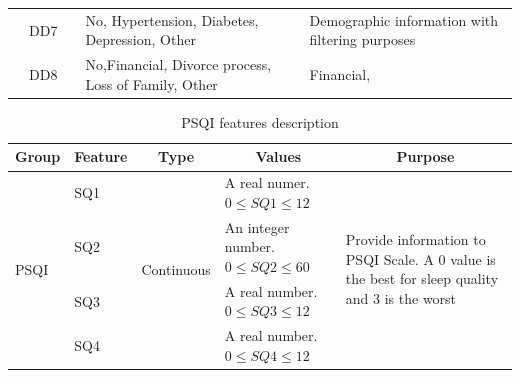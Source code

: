 \documentclass[]{book}
\begin{document}
\begin{table}[ht]
\begin{tabular}{|l|l|l|p{5cm}|p{4cm}|}
        & DD7                                   &                                    & No, Hypertension, Diabetes, Depression, Other                                            & Demographic information with filtering purposes                 \\ \cline{2-5} 
        & DD8                                   &                                    & No,Financial, Divorce process, Loss of Family, Other                                     & Financial,                                                      \\ \hline
    \end{tabular}
\end{table}

\begin{table}[ht]
    \centering
    \caption{PSQI features description}
    \label{tab:psqi-features-description}
    \begin{tabular}{|l|l|l|p{3cm}|p{5cm}|}
        \hline
        \multicolumn{1}{|c|}{\textbf{Group}} & \multicolumn{1}{c|}{\textbf{Feature}} & \multicolumn{1}{c|}{\textbf{Type}} & \multicolumn{1}{c|}{\textbf{Values}}                    & \multicolumn{1}{c|}{\textbf{Purpose}}                                                                              \\ \hline
        \multirow{18}{*}{PSQI}               & SQ1                                   & \multirow{4}{*}{Continuous}        & A real numer.   $ 0 \leq  SQ1 \leq 12 $                    & \multirow{18}{5cm}{Provide information to PSQI Scale. A 0 value is the best for sleep quality and 3 is the worst} \\ \cline{2-2} \cline{4-4}
        & SQ2                                   &                                    & An integer number. $ 0 \leq SQ2 \leq 60 $               &                                                                                                                 \\ \cline{2-2} \cline{4-4}
        & SQ3                                   &                                    & A real number. $ 0 \leq SQ3 \leq 12 $                      &                                                                                                                 \\ \cline{2-2} \cline{4-4}
        & SQ4                                   &                                    & A real number. $ 0 \leq SQ4 \leq 12 $                      &                                                                                                                 \\ \cline{2-4}

\end{tabular}
\end{table}
\end{document}
